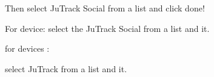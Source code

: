 \documentclass[letterpaper,10pt,english]{sphinxmanual}
\begin{document}
\begin{DUlineblock}{0em}
\item[] 
\end{DUlineblock}

Then select JuTrack Social from a list and click done!

\begin{DUlineblock}{0em}
\item[] 
\end{DUlineblock}


\begin{DUlineblock}{0em}
\item[] 
\end{DUlineblock}

For  device:
select the JuTrack Social from a list and  it.

\begin{DUlineblock}{0em}
\item[] 
\end{DUlineblock}


\begin{DUlineblock}{0em}
\item[] 
\end{DUlineblock}

for  devices :

\begin{DUlineblock}{0em}
\item[] 
\end{DUlineblock}


\begin{DUlineblock}{0em}
\item[] 
\end{DUlineblock}

select JuTrack from a list and  it.
\end{document}
